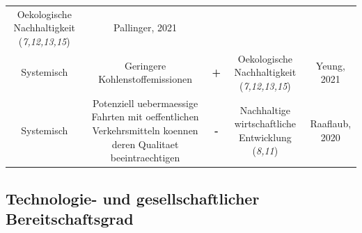 \documentclass[
]{book}
\begin{document}
\begin{longtable}[]{@{}ccccc@{}}
\begin{minipage}[t]{0.17\columnwidth}
Oekologische Nachhaltigkeit (\emph{7,12,13,15})\strut
\end{minipage} & \begin{minipage}[t]{0.17\columnwidth}\centering
Pallinger, 2021\strut
\end{minipage}\tabularnewline
\begin{minipage}[t]{0.17\columnwidth}\centering
Systemisch\strut
\end{minipage} & \begin{minipage}[t]{0.16\columnwidth}\centering
Geringere Kohlenstoffemissionen\strut
\end{minipage} & \begin{minipage}[t]{0.17\columnwidth}\centering
\textbf{+}\strut
\end{minipage} & \begin{minipage}[t]{0.17\columnwidth}\centering
Oekologische Nachhaltigkeit (\emph{7,12,13,15})\strut
\end{minipage} & \begin{minipage}[t]{0.17\columnwidth}\centering
Yeung, 2021\strut
\end{minipage}\tabularnewline
\begin{minipage}[t]{0.17\columnwidth}\centering
Systemisch\strut
\end{minipage} & \begin{minipage}[t]{0.16\columnwidth}\centering
Potenziell uebermaessige Fahrten mit oeffentlichen Verkehrsmitteln koennen deren Qualitaet beeintraechtigen\strut
\end{minipage} & \begin{minipage}[t]{0.17\columnwidth}\centering
\textbf{-}\strut
\end{minipage} & \begin{minipage}[t]{0.17\columnwidth}\centering
Nachhaltige wirtschaftliche Entwicklung (\emph{8,11})\strut
\end{minipage} & \begin{minipage}[t]{0.17\columnwidth}\centering
Raaflaub, 2020\strut
\end{minipage}\tabularnewline
\bottomrule
\end{longtable}

\hypertarget{technologie--und-gesellschaftlicher-bereitschaftsgrad-20}{%
\subsection*{Technologie- und gesellschaftlicher Bereitschaftsgrad}\label{technologie--und-gesellschaftlicher-bereitschaftsgrad-20}}
\end{document}
